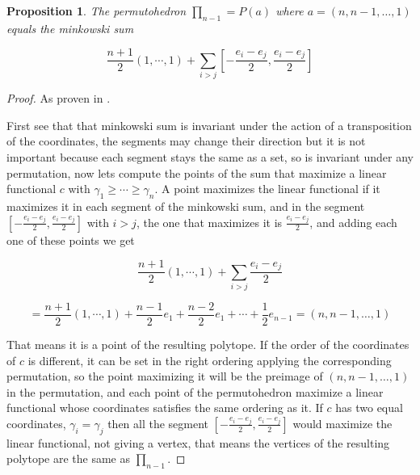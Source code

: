 \documentclass[12pt]{amsart}
\newtheorem{propo}[lemma]{Proposition}
\numberwithin{equation}{section}
\begin{document}
\begin{propo}
\label{propo:permzono}
The permutohedron $\prod_{n-1}=P(a)$ where $a=(n,n-1,\dots,1)$ equals the minkowski sum

$$ \frac{n+1}{2}(1,\cdots,1)+\sum_{i>j}[-\frac{e_i-e_j}{2},\frac{e_i-e_j}{2}] $$
\end{propo}

\begin{proof}
As proven in \cite{Ziegler}.

First see that that minkowski sum is invariant under the action of a transposition of the coordinates, the segments may change their direction but it is not important because each segment stays the same as a set, so is invariant under any permutation, now lets compute the points of the sum that maximize a linear functional $c$ with $\gamma_1\geq\cdots\geq\gamma_n$. A point maximizes the linear functional if it maximizes it in each segment of the minkowski sum, and in the segment $[-\frac{e_i-e_j}{2},\frac{e_i-e_j}{2}]$ with $i>j$, the one that maximizes it is $\frac{e_i-e_j}{2}$, and adding each one of these points we get

$$ \frac{n+1}{2}(1,\cdots,1)+\sum_{i>j}\frac{e_i-e_j}{2} $$

$$ =\frac{n+1}{2}(1,\cdots,1)+\frac{n-1}{2}e_1+\frac{n-2}{2}e_1+\cdots+\frac{1}{2}e_{n-1}=(n,n-1,\dots,1)$$

That means it is a point of the resulting polytope. If the order of the coordinates of $c$ is different, it can be set in the right ordering applying the corresponding permutation, so the point maximizing it will be the preimage of $(n,n-1,\dots,1)$ in the permutation, and each point of the permutohedron maximize a linear functional whose coordinates satisfies the same ordering as it. If $c$ has two equal coordinates, $\gamma_i=\gamma_j$ then all the segment $[-\frac{e_i-e_j}{2},\frac{e_i-e_j}{2}]$ would maximize the linear functional, not giving a vertex, that means the vertices of the resulting polytope are the same as $\prod_{n-1}$.
\end{proof}


\end{document}
